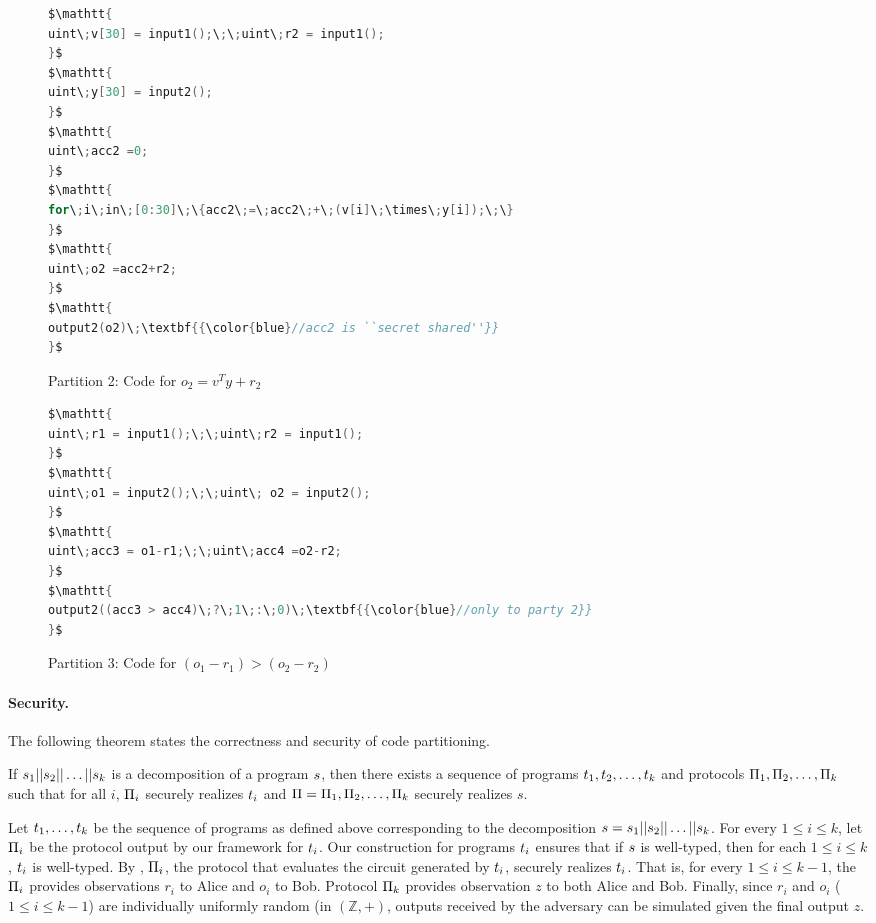 \begin{figure}
\begin{lstlisting}[language=C,mathescape=true]
$\mathtt{
uint\;v[30] = input1();\;\;uint\;r2 = input1();
}$
$\mathtt{
uint\;y[30] = input2();
}$
$\mathtt{
uint\;acc2 =0;
}$
$\mathtt{
for\;i\;in\;[0:30]\;\{acc2\;=\;acc2\;+\;(v[i]\;\times\;y[i]);\;\}
}$
$\mathtt{
uint\;o2 =acc2+r2;
}$
$\mathtt{
output2(o2)\;\textbf{{\color{blue}//acc2 is ``secret shared''}}
}$
\end{lstlisting}
\caption{Partition 2: Code for $o_2 = v^Ty+r_2$}
\label{fig:codepartitioning2}
\end{figure}

\begin{figure}
\begin{lstlisting}[language=C,mathescape=true]
$\mathtt{
uint\;r1 = input1();\;\;uint\;r2 = input1();
}$
$\mathtt{
uint\;o1 = input2();\;\;uint\; o2 = input2();
}$
$\mathtt{
uint\;acc3 = o1-r1;\;\;uint\;acc4 =o2-r2;
}$
$\mathtt{
output2((acc3 > acc4)\;?\;1\;:\;0)\;\textbf{{\color{blue}//only to party 2}}
}$
\end{lstlisting}
\caption{Partition 3: Code for $(o_1-r_1)>(o_2-r_2)$}
\label{fig:codepartitioning3}
\end{figure}



\paragraph{Security.} The following theorem states the correctness and security of
code partitioning.

\begin{theorem}
If $s_1||s_2||\ldots||s_k$ is a decomposition of a program $s$, then there exists a sequence of programs $t_1, t_2, \ldots, t_k$ and protocols $\Pi_1, \Pi_2, \ldots, \Pi_k$ such that for all $i$, $\Pi_i$ securely realizes $t_i$ and  $\Pi
= \Pi_1,\Pi_2,\dots,\Pi_k$ securely realizes $s$.
\end{theorem}

 Let $t_1, \ldots, t_k$ be the
sequence of programs as defined above corresponding to the
decomposition $s = s_1||s_2||\ldots||s_k$.  For every
$1\leq i\leq k$, let $\Pi_i$ be the \mpc protocol output by our
framework for $t_i$. Our construction for programs $t_i$
ensures that if $s$ is well-typed, then for each $1\leq i \leq k$,
$t_i$ is well-typed. By , $\Pi_i$,
the \mpc protocol that evaluates the circuit generated by $t_i$,
securely realizes $t_i$. That is, for every $1\leq i \leq k-1$,
the $\Pi_i$ provides observations $r_i$ to Alice and $o_i$
to Bob. Protocol $\Pi_k$ provides observation $z$ to both Alice
and Bob. Finally, since $r_i$ and $o_i$ ($1\leq i\leq k-1$) are
individually uniformly random (in $(\mathbb{Z},+)$, outputs received
by the adversary can be simulated given the final output $z$.


